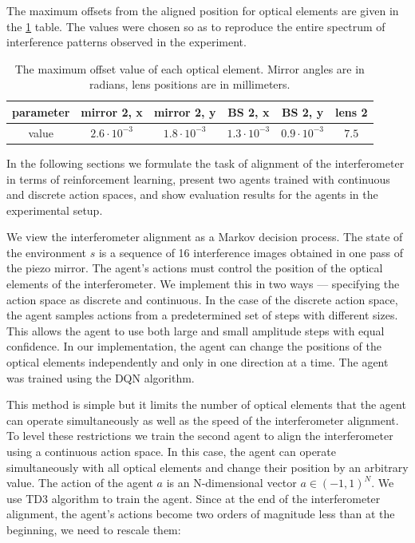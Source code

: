 The maximum offsets from the aligned position for optical elements are given in the \ref{tab:interf_dyn_params} table. The values were chosen so as to reproduce the entire spectrum of interference patterns observed in the experiment.

\begin{table} [htbp]
    \centering
    \begin{threeparttable}%
        \caption{The maximum offset value of each optical element. Mirror angles are in radians, lens positions are in millimeters.}
        \begin{tabular}{|c|c|c|c|c|c|}
            \hline
            \hline
            parameter & mirror 2, x & mirror 2, y & BS 2, x & BS 2, y & lens 2 \\
            \hline
            value & $2.6 \cdot 10^{-3}$ & $1.8 \cdot 10^{-3}$ & $1.3 \cdot 10^{-3}$ & $0.9 \cdot 10^{-3}$ & $7.5$ \\
            \hline
            \hline
        \end{tabular}
        \label{tab:interf_dyn_params}
    \end{threeparttable}
\end{table}


In the following sections we formulate the task of alignment of the interferometer in terms of reinforcement learning, present two agents trained with continuous and discrete action spaces, and show evaluation results for the agents in the experimental setup. 

We view the interferometer alignment as a Markov decision process. The state of the environment $s$ is a sequence of 16 interference images obtained in one pass of the piezo mirror. The agent's actions must control the position of the optical elements of the interferometer. We implement this in two ways --- specifying the action space as discrete and continuous. In the case of the discrete action space, the agent samples actions from a predetermined set of steps with different sizes. This allows the agent to use both large and small amplitude steps with equal confidence. In our implementation, the agent can change the positions of the optical elements independently and only in one direction at a time.  The agent was trained using the DQN \cite{dqn} algorithm.

This method is simple but it limits the number of optical elements that the agent can operate simultaneously as well as the speed of the interferometer alignment. To level these restrictions we train the second agent to align the interferometer using a continuous action space. In this case, the agent can operate simultaneously with all optical elements and change their position by an arbitrary value. The action of the agent $a$ is an N-dimensional vector $a \in (-1, 1)^{N}$. We use TD3 \cite{ddpg} algorithm to train the agent. Since at the end of the interferometer alignment, the agent's actions become two orders of magnitude less than at the beginning, we need to rescale them:

